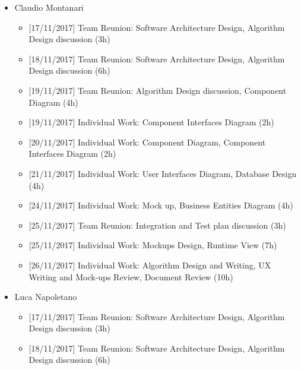 \begin{itemize}
    \item Claudio Montanari
        \begin{itemize}
            \item {[}17/11/2017{]} Team Reunion: Software Architecture Design, Algorithm Design discussion (3h)
            
            \item {[}18/11/2017{]} Team Reunion: Software Architecture Design, Algorithm Design discussion (6h)
            
            \item {[}19/11/2017{]} Team Reunion: Algorithm Design discussion, Component Diagram (4h)
            
            \item {[}19/11/2017{]} Individual Work: Component Interfaces Diagram (2h)
            
            \item {[}20/11/2017{]} Individual Work: Component Diagram, Component Interfaces Diagram (2h)
            
            \item {[}21/11/2017{]} Individual Work: User Interfaces Diagram, Database Design (4h)
            
            \item {[}24/11/2017{]} Individual Work: Mock up, Business Entities Diagram (4h)          


            \item {[}25/11/2017{]} Team Reunion: Integration and Test plan discussion (3h)
            
            \item {[}25/11/2017{]} Individual Work: Mockups Design, Runtime View (7h)
            
            \item {[}26/11/2017{]} Individual Work: Algorithm Design and Writing, UX Writing and Mock-ups Review, Document Review (10h)

        \end{itemize}
    
    \item Luca Napoletano
        \begin{itemize}
            \item {[}17/11/2017{]} Team Reunion: Software Architecture Design, Algorithm Design discussion (3h)
            
            \item {[}18/11/2017{]} Team Reunion: Software Architecture Design, Algorithm Design discussion (6h)
            

\end{itemize}
\end{itemize}
